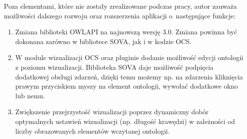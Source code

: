 Poza elementami, które nie zostały zrealizowane podczas pracy, autor zauważa możliwości dalszego rozwoju oraz rozszerzenia aplikacji o~następujące funkcje:
\begin{enumerate}
 \item Zmiana biblioteki OWLAPI na najnowszą wersję 3.0. Zmiana powinna być dokonana zarówno w bibliotece SOVA, jak i w kodzie OCS.
 \item W module wizualizacji OCS oraz pluginie dodanie możliwość edycji ontologii z poziomu wizualizacji. Biblioteka SOVA daje możliwość podpięcia dodatkowej obsługi 
zdarzeń, dzięki temu możemy np. na zdarzenia kliknięcia prawym przyciskiem myszy na element ontologii, wywołać dodatkowe okno lub nemu. 
 \item Zwiększenie przejrzystość wizualizacji poprzez dynamiczny dobór optymalnych ustawień wizualizacji (np. długość krawędzi) w zależności od liczby obrazowanych 
elementów wczytanej ontologii.
\end{enumerate}


\newpage



